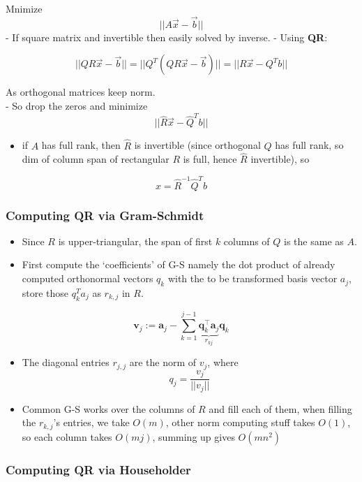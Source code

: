 \documentclass[
]{article}
\providecommand{\tightlist}{%
  \setlength{\itemsep}{0pt}\setlength{\parskip}{0pt}}
\begin{document}
Mnimize \[
||A \vec{x} - \vec{b}||
\] - If square matrix and invertible then easily solved by inverse. -
Using \textbf{QR}:

\[
||QR\vec{x}-\vec{b}||=||Q^T(QR\vec{x}-\vec{b})||=||R\vec{x} - Q^T b||
\]

As orthogonal matrices keep norm.\\
- So drop the zeros and minimize \[||\hat{R}\vec{x} - \hat{Q}^T b||\]

\begin{itemize}
\tightlist
\item
  if \(A\) has full rank, then \(\hat{R}\) is invertible (since
  orthogonal \(Q\) has full rank, so dim of column span of rectangular
  \(R\) is full, hence \(\hat{R}\) invertible), so
\end{itemize}

\[x=\hat{R}^{-1}\hat{Q}^Tb\]

\hypertarget{computing-qr-via-gram-schmidt}{%
\subsubsection{\texorpdfstring{\textbf{Computing QR via
Gram-Schmidt}}{Computing QR via Gram-Schmidt}}\label{computing-qr-via-gram-schmidt}}

\begin{itemize}
\item
  Since \(R\) is upper-triangular, the span of first \(k\) columns of
  \(Q\) is the same as \(A\).
\item
  First compute the `coefficients' of G-S namely the dot product of
  already computed orthonormal vectors \(q_k\) with the to be
  transformed basis vector \(a_j\), store those \(q_k^Ta_j\) as
  \(r_{k,j}\) in \(R\).
\end{itemize}

\[𝐯_j := 𝐚_j - \sum_{k=1}^{j-1} \underbrace{𝐪_k^\top 𝐚_j}_{r_{kj}}𝐪_k\]

\begin{itemize}
\item
  The diagonal entries \(r_{j,j}\) are the norm of \(v_j\), where
  \[q_j=\frac{v_j}{||v_j||}\]
\item
  Common G-S works over the columns of \(R\) and fill each of them, when
  filling the \(r_{k,j}\)'s entries, we take \(O(m)\), other norm
  computing stuff takes \(O(1)\), so each column takes \(O(mj)\),
  summing up gives \(O(mn^2)\)
\end{itemize}

\hypertarget{computing-qr-via-householder}{%
\subsubsection{\texorpdfstring{\textbf{Computing QR via
Householder}}{Computing QR via Householder}}\label{computing-qr-via-householder}}
\end{document}
